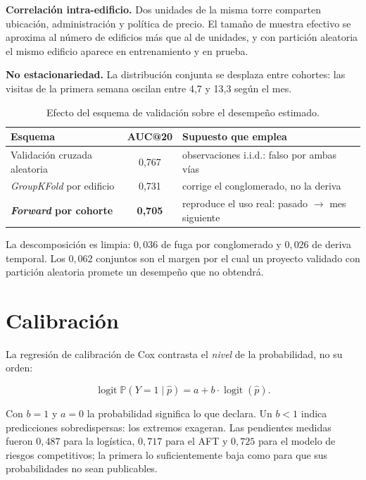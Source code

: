 \documentclass[11pt,a4paper]{article}
\theoremstyle{definition}
\newcommand{\Prob}{\mathbb{P}}
\begin{document}
\textbf{Correlación intra-edificio.} Dos unidades de la misma torre comparten
ubicación, administración y política de precio. El tamaño de muestra efectivo se
aproxima al número de edificios más que al de unidades, y con partición aleatoria
el mismo edificio aparece en entrenamiento y en prueba.

\textbf{No estacionariedad.} La distribución conjunta se desplaza entre cohortes:
las visitas de la primera semana oscilan entre 4,7 y 13,3 según el mes.

\begin{table}[h]
\centering
\begin{tabular}{@{}lcl@{}}
\toprule
Esquema & AUC@20 & Supuesto que emplea \\
\midrule
Validación cruzada aleatoria & 0,767 & observaciones i.i.d.: falso por ambas vías \\
\emph{GroupKFold} por edificio & 0,731 & corrige el conglomerado, no la deriva \\
\textbf{\emph{Forward} por cohorte} & \textbf{0,705} & reproduce el uso real: pasado $\to$ mes siguiente \\
\bottomrule
\end{tabular}
\caption{Efecto del esquema de validación sobre el desempeño estimado.}
\end{table}

La descomposición es limpia: $0{,}036$ de fuga por conglomerado y $0{,}026$ de
deriva temporal. Los $0{,}062$ conjuntos son el margen por el cual un proyecto
validado con partición aleatoria promete un desempeño que no obtendrá.

\section{Calibración}

La regresión de calibración de Cox contrasta el \emph{nivel} de la probabilidad,
no su orden:

\begin{equation}
\operatorname{logit}\Prob(Y=1\mid \hat{p})=a+b\cdot\operatorname{logit}(\hat{p}).
\label{eq:calib}
\end{equation}

Con $b=1$ y $a=0$ la probabilidad significa lo que declara. Un $b<1$ indica
predicciones sobredispersas: los extremos exageran. Las pendientes medidas fueron
$0{,}487$ para la logística, $0{,}717$ para el AFT y $0{,}725$ para el modelo de
riesgos competitivos; la primera lo suficientemente baja como para que sus
probabilidades no sean publicables.
\end{document}
